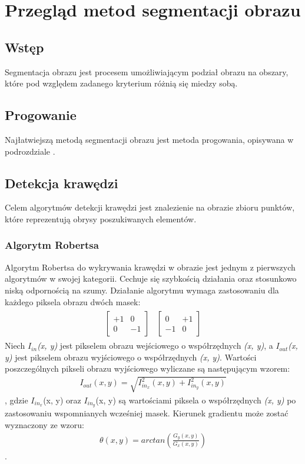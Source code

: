 \section{Przegląd metod segmentacji obrazu}
\subsection{Wstęp}
Segmentacja obrazu jest procesem umożliwiającym podział obrazu na obszary, które pod względem zadanego kryterium różnią się miedzy sobą. 
\subsection{Progowanie}
Najłatwiejszą metodą segmentacji obrazu jest metoda progowania, opisywana w podrozdziale .

\subsection{Detekcja krawędzi}
Celem algorytmów detekcji krawędzi jest znalezienie na obrazie zbioru punktów, które reprezentują obrysy poszukiwanych elementów. 

\subsubsection{Algorytm Robertsa}
Algorytm Robertsa do wykrywania krawędzi w obrazie jest jednym z pierwszych algorytmów w swojej kategorii. Cechuje się szybkością działania oraz stosunkowo niską odpornością na szumy. Działanie algorytmu wymaga zastosowaniu dla każdego piksela obrazu dwóch masek:
\begin{gather*}
\begin{matrix}
  \begin{bmatrix}
    +1 & 0 \\
    0 & -1
  \end{bmatrix}
&
  \begin{bmatrix}
    0 & +1 \\
    -1 & 0
  \end{bmatrix}
\end{matrix}
\end{gather*}
Niech \textit{$I_{in}$(x, y)} jest pikselem obrazu wejściowego o współrzędnych \textit{(x, y)}, a \textit{$I_{out}$(x, y)} jest pikselem obrazu wyjściowego o współrzędnych \textit{(x, y)}. Wartości poszczególnych pikseli obrazu wyjściowego wyliczane są następującym wzorem:
\begin{gather*}
  I_{out}(x, y) = \sqrt{I_{in_x}^2(x, y)+I_{in_y}^2(x, y)}
\end{gather*}, gdzie \textit{$I_{in_x}$}(x, y) oraz \textit{$I_{in_y}$}(x, y) są wartościami piksela o współrzędnych \textit{(x, y)} po zastosowaniu wspomnianych wcześniej masek.
Kierunek gradientu może zostać wyznaczony ze wzoru:
\begin{gather*}
  \theta(x, y) = arctan(\frac{G_y(x, y)}{G_x(x, y)})
\end{gather*}.
